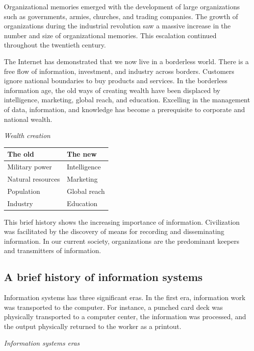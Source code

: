 \documentclass[
]{article}
\begin{document}
Organizational memories emerged with the development of large
organizations such as governments, armies, churches, and trading
companies. The growth of organizations during the industrial revolution
saw a massive increase in the number and size of organizational
memories. This escalation continued throughout the twentieth century.

The Internet has demonstrated that we now live in a borderless world.
There is a free flow of information, investment, and industry across
borders. Customers ignore national boundaries to buy products and
services. In the borderless information age, the old ways of creating
wealth have been displaced by intelligence, marketing, global reach, and
education. Excelling in the management of data, information, and
knowledge has become a prerequisite to corporate and national wealth.

\emph{Wealth creation}

\begin{longtable}[]{@{}ll@{}}
\toprule
The old & The new \\
\midrule
\endhead
Military power & Intelligence \\
Natural resources & Marketing \\
Population & Global reach \\
Industry & Education \\
\bottomrule
\end{longtable}

This brief history shows the increasing importance of information.
Civilization was facilitated by the discovery of means for recording and
disseminating information. In our current society, organizations are the
predominant keepers and transmitters of information.

\hypertarget{a-brief-history-of-information-systems}{%
\subsection*{A brief history of information systems}\label{a-brief-history-of-information-systems}}

Information systems has three significant eras. In the first era,
information work was transported to the computer. For instance, a
punched card deck was physically transported to a computer center, the
information was processed, and the output physically returned to the
worker as a printout.

\emph{Information systems eras}
\end{document}
